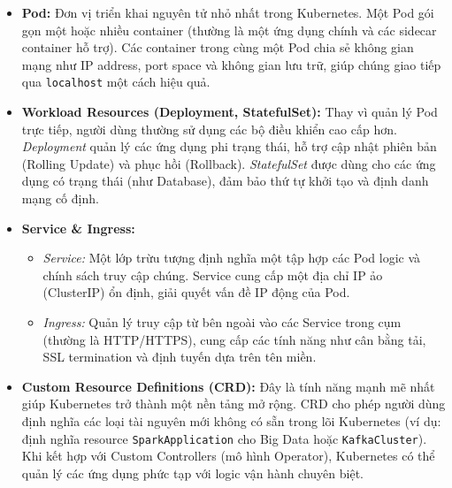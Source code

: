\begin{itemize}
    \item \textbf{Pod:} Đơn vị triển khai nguyên tử nhỏ nhất trong Kubernetes. Một Pod gói gọn một hoặc nhiều container (thường là một ứng dụng chính và các sidecar container hỗ trợ). Các container trong cùng một Pod chia sẻ không gian mạng như IP address, port space và không gian lưu trữ, giúp chúng giao tiếp qua \texttt{localhost} một cách hiệu quả.
    
    \item \textbf{Workload Resources (Deployment, StatefulSet):} Thay vì quản lý Pod trực tiếp, người dùng thường sử dụng các bộ điều khiển cao cấp hơn. \textit{Deployment} quản lý các ứng dụng phi trạng thái, hỗ trợ cập nhật phiên bản (Rolling Update) và phục hồi (Rollback). \textit{StatefulSet} được dùng cho các ứng dụng có trạng thái (như Database), đảm bảo thứ tự khởi tạo và định danh mạng cố định.

    \item \textbf{Service \& Ingress:}
    \begin{itemize}
        \item \textit{Service:} Một lớp trừu tượng định nghĩa một tập hợp các Pod logic và chính sách truy cập chúng. Service cung cấp một địa chỉ IP ảo (ClusterIP) ổn định, giải quyết vấn đề IP động của Pod.
        \item \textit{Ingress:} Quản lý truy cập từ bên ngoài vào các Service trong cụm (thường là HTTP/HTTPS), cung cấp các tính năng như cân bằng tải, SSL termination và định tuyến dựa trên tên miền.
    \end{itemize}

    \item \textbf{Custom Resource Definitions (CRD):} Đây là tính năng mạnh mẽ nhất giúp Kubernetes trở thành một nền tảng mở rộng. CRD cho phép người dùng định nghĩa các loại tài nguyên mới không có sẵn trong lõi Kubernetes (ví dụ: định nghĩa resource \texttt{SparkApplication} cho Big Data hoặc \texttt{KafkaCluster}). Khi kết hợp với Custom Controllers (mô hình Operator), Kubernetes có thể quản lý các ứng dụng phức tạp với logic vận hành chuyên biệt.
\end{itemize}